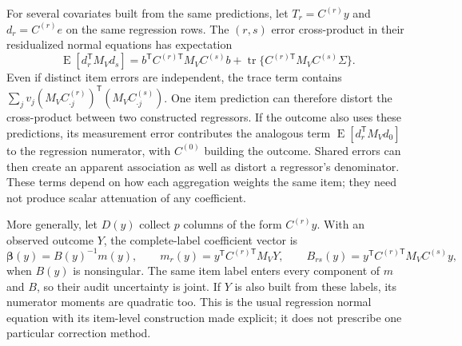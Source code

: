 \documentclass[11pt,letterpaper]{article}
\newcommand{\E}{\operatorname{E}}
\begin{document}
For several covariates built from the same predictions, let
$T_r=C^{(r)}y$ and $d_r=C^{(r)}e$ on the same regression rows. The
$(r,s)$ error cross-product in their residualized normal equations has
expectation
\begin{equation}\label{eq:crossnormal}
 \E[d_r^{\mathsf T}M_Vd_s]
 =b^{\mathsf T}C^{(r)\mathsf T}M_VC^{(s)}b
  +\operatorname{tr}\{C^{(r)\mathsf T}M_VC^{(s)}\Sigma\}.
\end{equation}
Even if distinct item errors are independent, the trace term contains
$\sum_jv_j(M_VC^{(r)}_{\cdot j})^{\mathsf T}
                  (M_VC^{(s)}_{\cdot j})$.
One item prediction can therefore distort the cross-product between two
constructed regressors. If the outcome also uses these predictions, its
measurement error contributes the analogous term
$\E[d_r^{\mathsf T}M_Vd_0]$ to the regression numerator, with $C^{(0)}$
building the outcome. Shared errors can then create an apparent association
as well as distort a regressor's denominator. These terms depend on how each
aggregation weights the same item; they need not produce scalar attenuation
of any coefficient.

More generally, let $D(y)$ collect $p$ columns of the form $C^{(r)}y$.
With an observed outcome $Y$, the
complete-label coefficient vector is
\begin{equation}\label{eq:multicovariate}
 \boldsymbol\beta(y)=B(y)^{-1}m(y),\qquad
 m_r(y)=y^{\mathsf T}C^{(r)\mathsf T}M_VY,\qquad
 B_{rs}(y)=y^{\mathsf T}C^{(r)\mathsf T}M_VC^{(s)}y,
\end{equation}
when $B(y)$ is nonsingular. The same item label enters every component of
$m$ and $B$, so their audit uncertainty is joint. If $Y$ is also built from
these labels, its numerator moments are quadratic too. This is the usual
regression normal equation with its item-level construction made explicit;
it does not prescribe one particular correction method.
\end{document}
